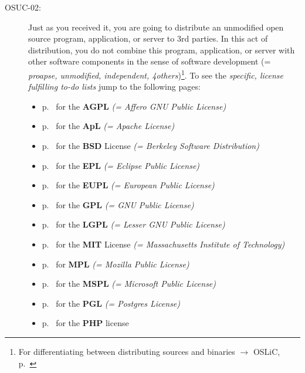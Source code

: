 \begin{description}
\item[OSUC-02:]\label{OSUC-02-DEF} Just as you received it, you are going to
distribute an unmodified open source program, application, or server to 3rd
parties. In this act of distribution, you do not combine this program,
application, or server with other software components in the sense of software
development (= \textit{proapse, unmodified, independent, 4others})\footnote{For
differentiating between distributing sources and binaries $\rightarrow$ OSLiC,
p.\ \pageref{sec:SourceBinaryDifference}}. To see the \textit{specific, license
fulfilling to-do lists} jump to the following pages:
   \begin{itemize}
    \item p.\ \pageref{OSUC-02-AGPL} for the \textbf{AGPL}
      \textit{(= Affero GNU Public License)} 
    \item p.\ \pageref{OSUC-02-Apache20} for the \textbf{ApL}
      \textit{(= Apache License)}
    \item p.\ \pageref{OSUC-02-BSD} for the \textbf{BSD} License
      \textit{(= Berkeley Software Distribution)}
    \item p.\ \pageref{OSUC-02-EPL} for the \textbf{EPL}
      \textit{(= Eclipse Public License)}     
    \item p.\ \pageref{OSUC-02-EUPL} for the \textbf{EUPL}
      \textit{(= European Public License)} 
    \item p.\ \pageref{OSUC-02-GPL} for the \textbf{GPL}
       \textit{(= GNU Public License)} 
    \item p.\ \pageref{OSUC-02-LGPL} for the \textbf{LGPL}
      \textit{(= Lesser GNU Public License)}           
    \item p.\ \pageref{OSUC-02-MIT} for the \textbf{MIT} License
       \textit{(= Massachusetts Institute of Technology)} 
    \item p.\ \pageref{OSUC-02-MPL} for \textbf{MPL}
      \textit{(= Mozilla Public License)}     
    \item p.\ \pageref{OSUC-02-MsPL} for the \textbf{MSPL}
      \textit{(= Microsoft Public License)} 
    \item p.\ \pageref{OSUC-02-PGL} for the \textbf{PGL}
      \textit{(= Postgres License)} 
    \item p.\ \pageref{OSUC-02-PHP} for the \textbf{PHP} license 
  \end{itemize}


\end{description}
